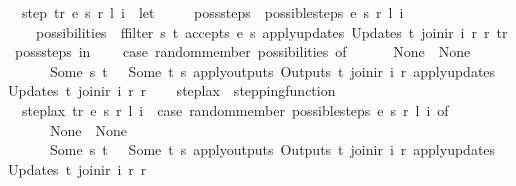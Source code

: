 \begin{isabellebody}
\ \ {\isachardoublequoteopen}step\ tr\ e\ s\ r\ l\ i\ {\isacharequal}\ {\isacharparenleft}let\ \isanewline
\ \ \ \ poss{\isacharunderscore}steps\ {\isacharequal}\ {\isacharparenleft}possible{\isacharunderscore}steps\ e\ s\ r\ l\ i{\isacharparenright}{\isacharsemicolon}\isanewline
\ \ \ \ possibilities\ {\isacharequal}\ ffilter\ {\isacharparenleft}{\isasymlambda}{\isacharparenleft}s{\isacharprime}{\isacharcomma}\ t{\isacharparenright}{\isachardot}\ accepts\ e\ s{\isacharprime}\ {\isacharparenleft}apply{\isacharunderscore}updates\ {\isacharparenleft}Updates\ t{\isacharparenright}\ {\isacharparenleft}join{\isacharunderscore}ir\ i\ r{\isacharparenright}\ r{\isacharparenright}\ tr{\isacharparenright}\ poss{\isacharunderscore}steps\ in\isanewline
\ \ \ \ case\ random{\isacharunderscore}member\ possibilities\ of\isanewline
\ \ \ \ \ \ None\ {\isasymRightarrow}\ None\ {\isacharbar}\isanewline
\ \ \ \ \ \ Some\ {\isacharparenleft}s{\isacharprime}{\isacharcomma}\ t{\isacharparenright}\ {\isasymRightarrow}\ \ Some\ {\isacharparenleft}t{\isacharcomma}\ s{\isacharprime}{\isacharcomma}\ apply{\isacharunderscore}outputs\ {\isacharparenleft}Outputs\ t{\isacharparenright}\ {\isacharparenleft}join{\isacharunderscore}ir\ i\ r{\isacharparenright}{\isacharcomma}\ apply{\isacharunderscore}updates\ {\isacharparenleft}Updates\ t{\isacharparenright}\ {\isacharparenleft}join{\isacharunderscore}ir\ i\ r{\isacharparenright}\ r{\isacharparenright}\isanewline
\ \ {\isacharparenright}{\isachardoublequoteclose}\isanewline
\isanewline
{}\isamarkupfalse%
\ step{\isacharunderscore}lax\ {\isacharcolon}{\isacharcolon}\ stepping{\isacharunderscore}function\ \isanewline
\ \ {\isachardoublequoteopen}step{\isacharunderscore}lax\ tr\ e\ s\ r\ l\ i\ {\isacharequal}\ {\isacharparenleft}case\ random{\isacharunderscore}member\ {\isacharparenleft}possible{\isacharunderscore}steps\ e\ s\ r\ l\ i{\isacharparenright}\ of\isanewline
\ \ \ \ \ \ None\ {\isasymRightarrow}\ None\ {\isacharbar}\isanewline
\ \ \ \ \ \ Some\ {\isacharparenleft}s{\isacharprime}{\isacharcomma}\ t{\isacharparenright}\ {\isasymRightarrow}\ \ Some\ {\isacharparenleft}t{\isacharcomma}\ s{\isacharprime}{\isacharcomma}\ apply{\isacharunderscore}outputs\ {\isacharparenleft}Outputs\ t{\isacharparenright}\ {\isacharparenleft}join{\isacharunderscore}ir\ i\ r{\isacharparenright}{\isacharcomma}\ apply{\isacharunderscore}updates\ {\isacharparenleft}Updates\ t{\isacharparenright}\ {\isacharparenleft}join{\isacharunderscore}ir\ i\ r{\isacharparenright}\ r{\isacharparenright}\isanewline
\ \ {\isacharparenright}{\isachardoublequoteclose}\isanewline

\end{isabellebody}
